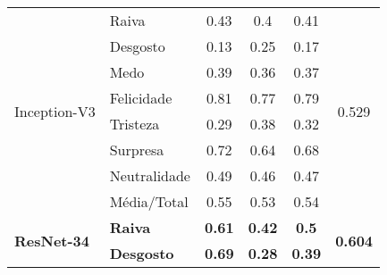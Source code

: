 \begin{table}[]
\begin{tabular}{llcccc}
\multirow{8}{*}{Inception-V3}     & Raiva                 & 0.43                                  & 0.4                                    & 0.41                                  & \multirow{8}{*}{0.529}                \\
                                       & Desgosto              & 0.13                                  & 0.25                                   & 0.17                                  &                                       \\
                                       & Medo                  & 0.39                                  & 0.36                                   & 0.37                                  &                                       \\
                                       & Felicidade            & 0.81                                  & 0.77                                   & 0.79                                  &                                       \\
                                       & Tristeza              & 0.29                                  & 0.38                                   & 0.32                                  &                                       \\
                                       & Surpresa              & 0.72                                  & 0.64                                   & 0.68                                  &                                       \\
                                       & Neutralidade          & 0.49                                  & 0.46                                   & 0.47                                  &                                       \\
                                       & Média/Total           & 0.55                                  & 0.53                                   & 0.54                                  &                                       \\ \hline
\multirow{8}{*}{\textbf{ResNet-34}} & \textbf{Raiva}        & \textbf{0.61}                         & \textbf{0.42}                          & \textbf{0.5}                          & \multirow{8}{*}{\textbf{0.604}}       \\
                                       & \textbf{Desgosto}     & \textbf{0.69}                         & \textbf{0.28}                          & \textbf{0.39}                         &                                       \\

\end{tabular}
\end{table}
